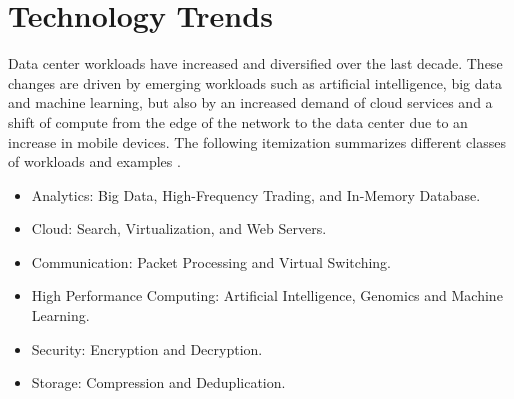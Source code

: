 \chapter{Technology Trends}
\label{ch:trends}
Data center workloads have increased and diversified over the last decade. These changes are driven by emerging workloads such as artificial intelligence, big data and machine learning, but also by an increased demand of cloud services and a shift of compute from the edge of the network to the data center due to an increase in mobile devices. The following itemization summarizes different classes of workloads and examples \cite{stuecheli-power9, amd-epyc-datasheet, gupta-xeon}.

\begin{itemize}
  \item{Analytics: Big Data, High-Frequency Trading, and In-Memory Database.}
  \item{Cloud: Search, Virtualization, and Web Servers.}
  \item{Communication: Packet Processing and Virtual Switching.}
  \item{High Performance Computing: Artificial Intelligence, Genomics and Machine Learning.}
  \item{Security: Encryption and Decryption.}
  \item{Storage: Compression and Deduplication.}
\end{itemize}


